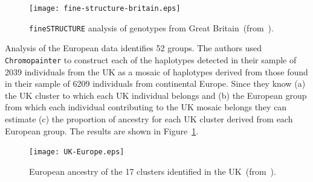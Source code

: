 \documentclass[12pt]{article}
\begin{document}
\begin{figure}
\begin{center}
\texttt{[image: fine-structure-britain.eps]}
\end{center}
\caption{{\tt fineSTRUCTURE} analysis of genotypes from Great Britain~(from~\cite{Leslie-etal-2015}).}
\end{figure}

Analysis of the European data identifies 52 groups. The authors used
{\tt Chromopainter} to construct each of the haplotypes detected in
their sample of 2039 individuals from the UK as a mosaic of haplotypes
derived from those found in their sample of 6209 individuals from
continental Europe. Since they know (a) the UK cluster to which each
UK individual belongs and (b) the European group from which each
individual contributing to the UK mosaic belongs they can estimate (c)
the proportion of ancestry for each UK cluster derived from each
European group. The results are shown in Figure~\ref{fig:UK-Europe}.

\begin{figure}
\begin{center}
\texttt{[image: UK-Europe.eps]}
\end{center}
\caption{European ancestry of the 17 clusters identified in the UK~(from~\cite{Leslie-etal-2015}).}\label{fig:UK-Europe}
\end{figure}




\ccLicense
\end{document}
